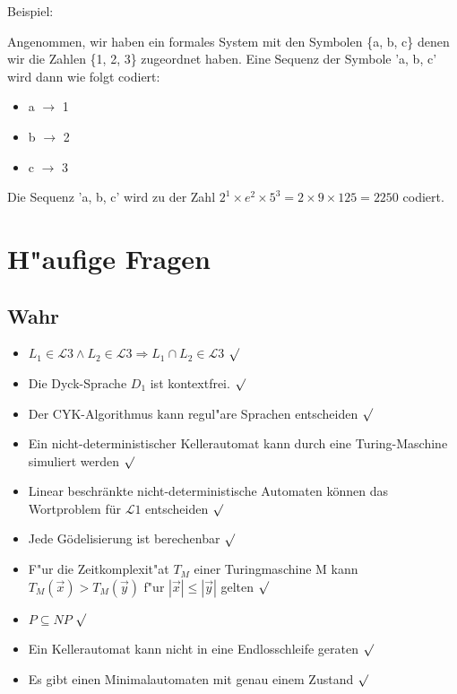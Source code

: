 \documentclass[11pt, a4paper]{scrartcl}
\newcommand{\gr}[1]{{\color{Green}#1}}
\begin{document}
Beispiel:

Angenommen, wir haben ein formales System mit den Symbolen \{a, b, c\} denen wir die Zahlen \{1, 2, 3\} zugeordnet haben. Eine Sequenz der Symbole 'a, b, c' wird dann wie folgt codiert:

\begin{itemize}
    \item a $\rightarrow$ 1
    \item b $\rightarrow$ 2
    \item c $\rightarrow$ 3
\end{itemize}

Die Sequenz 'a, b, c' wird zu der Zahl $2^1 \times e^2 \times 5^3 = 2 \times 9 \times 125 = 2250$ codiert.

\newpage

\section{H"aufige Fragen}

\subsection*{Wahr}
\begin{itemize}
    \item $L_1 \in \mathcal{L}3 \land L_2 \in \mathcal{L}3 \Rightarrow L_1 \cap L_2 \in \mathcal{L}3$ \gr{$\surd $}
    \item Die Dyck-Sprache $D_1$ ist kontextfrei. \gr{$\surd $}
    \item Der CYK-Algorithmus kann regul"are Sprachen entscheiden \gr{$\surd $}
    \item Ein nicht-deterministischer Kellerautomat kann durch eine Turing-Maschine simuliert werden \gr{$\surd $}
    \item Linear beschränkte nicht-deterministische Automaten können das Wortproblem für $\mathcal{L}1$ entscheiden \gr{$\surd $}
    \item Jede Gödelisierung ist berechenbar \gr{$\surd $}
    \item F"ur die Zeitkomplexit"at $T_M$ einer Turingmaschine M kann $T_M(\vec{x}) > T_M(\vec{y})$ f"ur $|\vec{x}| \leq |\vec{y}|$ gelten \gr{$\surd $}
    \item $P \subseteq NP$ \gr{$\surd $}
    \item Ein Kellerautomat kann nicht in eine Endlosschleife geraten \gr{$\surd $}
    \item Es gibt einen Minimalautomaten mit genau einem Zustand \gr{$\surd $}
\end{itemize}
\end{document}
